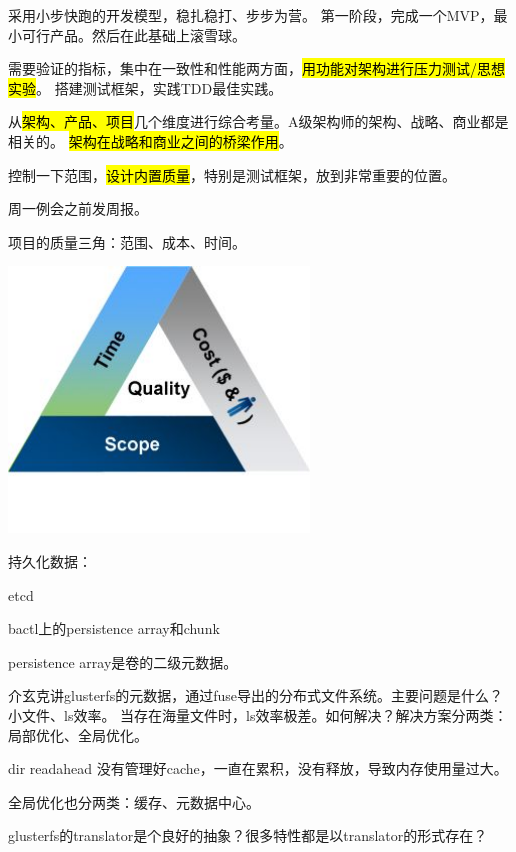采用小步快跑的开发模型，稳扎稳打、步步为营。
第一阶段，完成一个MVP，最小可行产品。然后在此基础上滚雪球。

需要验证的指标，集中在一致性和性能两方面，\hl{用功能对架构进行压力测试/思想实验}。
搭建测试框架，实践TDD最佳实践。

从\hl{架构、产品、项目}几个维度进行综合考量。A级架构师的架构、战略、商业都是相关的。
\hl{架构在战略和商业之间的桥梁作用}。

控制一下范围，\hl{设计内置质量}，特别是测试框架，放到非常重要的位置。

\hrulefill

周一例会之前发周报。

项目的质量三角：范围、成本、时间。
\begin{center}
\includegraphics[width=8cm]{../imgs/quality.jpeg}
\end{center}

\hrulefill

持久化数据：
\begin{enumbox}
\item etcd
\item bactl上的persistence array和chunk
\end{enumbox}

persistence array是卷的二级元数据。

\hrulefill

介玄克讲glusterfs的元数据，通过fuse导出的分布式文件系统。主要问题是什么？小文件、ls效率。
当存在海量文件时，ls效率极差。如何解决？解决方案分两类：局部优化、全局优化。

dir readahead 没有管理好cache，一直在累积，没有释放，导致内存使用量过大。

全局优化也分两类：缓存、元数据中心。

glusterfs的translator是个良好的抽象？很多特性都是以translator的形式存在？

